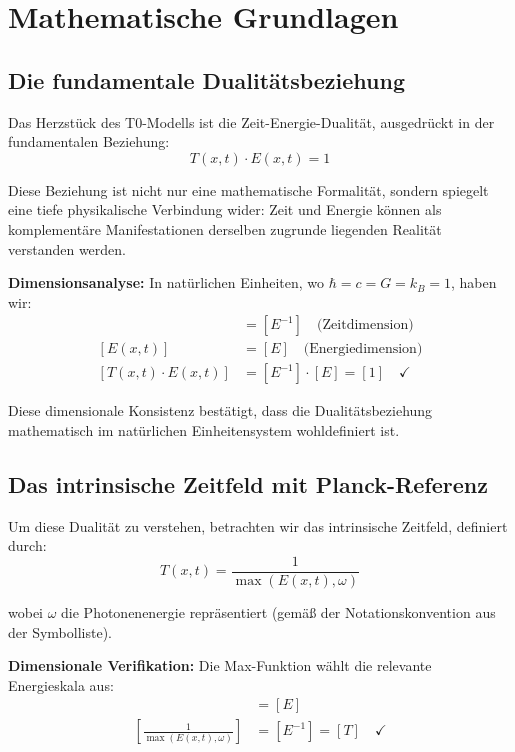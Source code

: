\documentclass[12pt,a4paper]{report}
\newcommand{\natunits}{\hbar = c = G = k_B = 1} %
\begin{document}
	\section{Mathematische Grundlagen}\label{sec:mathematical_foundations}
	
	\subsection{Die fundamentale Dualitätsbeziehung}\label{subsec:fundamental_duality}
	
	Das Herzstück des T0-Modells ist die Zeit-Energie-Dualität, ausgedrückt in der fundamentalen Beziehung:
	\begin{equation}
		\boxed{T(x,t) \cdot E(x,t) = 1}
		\label{eq:time_energy_duality}
	\end{equation}
	
	Diese Beziehung ist nicht nur eine mathematische Formalität, sondern spiegelt eine tiefe physikalische Verbindung wider: Zeit und Energie können als komplementäre Manifestationen derselben zugrunde liegenden Realität verstanden werden.
	
	\textbf{Dimensionsanalyse:} In natürlichen Einheiten, wo $\natunits$, haben wir:
	\begin{align}
		[T(x,t)] &= [E^{-1}] \quad \text{(Zeitdimension)} \\
		[E(x,t)] &= [E] \quad \text{(Energiedimension)} \\
		[T(x,t) \cdot E(x,t)] &= [E^{-1}] \cdot [E] = [1] \quad \checkmark
	\end{align}
	
	Diese dimensionale Konsistenz bestätigt, dass die Dualitätsbeziehung mathematisch im natürlichen Einheitensystem wohldefiniert ist.
	
	\subsection{Das intrinsische Zeitfeld mit Planck-Referenz}\label{subsec:intrinsic_time_field}
	
	Um diese Dualität zu verstehen, betrachten wir das intrinsische Zeitfeld, definiert durch:
	\begin{equation}
		T(x,t) = \frac{1}{\max(E(x,t), \omega)}
		\label{eq:intrinsic_time_field}
	\end{equation}
	
	wobei $\omega$ die Photonenenergie repräsentiert (gemäß der Notationskonvention aus der Symbolliste).
	
	\textbf{Dimensionale Verifikation:} Die Max-Funktion wählt die relevante Energieskala aus:
	\begin{align}
		[\max(E(x,t), \omega)] &= [E] \\
		\left[\frac{1}{\max(E(x,t), \omega)}\right] &= [E^{-1}] = [T] \quad \checkmark
	\end{align}
	
\end{document}
